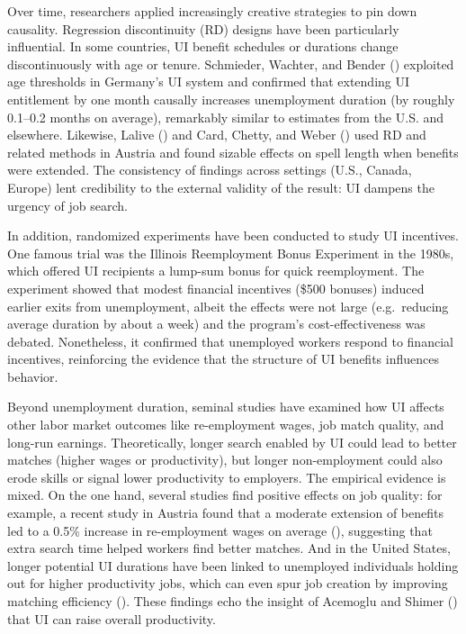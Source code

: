 \documentclass[
  4pt,
]{report}
\begin{document}
Over time, researchers applied increasingly creative strategies to pin
down causality. Regression discontinuity (RD) designs have been
particularly influential. In some countries, UI benefit schedules or
durations change discontinuously with age or tenure. Schmieder, Wachter,
and Bender () exploited age thresholds
in Germany's UI system and confirmed that extending UI entitlement by
one month causally increases unemployment duration (by roughly 0.1--0.2
months on average), remarkably similar to estimates from the U.S. and
elsewhere. Likewise, Lalive () and Card,
Chetty, and Weber () used RD and related
methods in Austria and found sizable effects on spell length when
benefits were extended. The consistency of findings across settings
(U.S., Canada, Europe) lent credibility to the external validity of the
result: UI dampens the urgency of job search.

In addition, randomized experiments have been conducted to study UI
incentives. One famous trial was the Illinois Reemployment Bonus
Experiment in the 1980s, which offered UI recipients a lump-sum bonus
for quick reemployment. The experiment showed that modest financial
incentives (\$500 bonuses) induced earlier exits from unemployment,
albeit the effects were not large (e.g.~reducing average duration by
about a week) and the program's cost-effectiveness was debated.
Nonetheless, it confirmed that unemployed workers respond to financial
incentives, reinforcing the evidence that the structure of UI benefits
influences behavior.

Beyond unemployment duration, seminal studies have examined how UI
affects other labor market outcomes like re-employment wages, job match
quality, and long-run earnings. Theoretically, longer search enabled by
UI could lead to better matches (higher wages or productivity), but
longer non-employment could also erode skills or signal lower
productivity to employers. The empirical evidence is mixed. On the one
hand, several studies find positive effects on job quality: for example,
a recent study in Austria found that a moderate extension of benefits
led to a 0.5\% increase in re-employment wages on average
(), suggesting that
extra search time helped workers find better matches. And in the United
States, longer potential UI durations have been linked to unemployed
individuals holding out for higher productivity jobs, which can even
spur job creation by improving matching efficiency
(). These findings echo
the insight of Acemoglu and Shimer ()
that UI can raise overall productivity.
\end{document}
